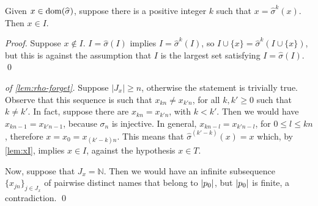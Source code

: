 
\begin{lemma}
\label{lem:xI}
Given $x \in \operatorname{dom}(\widehat{\sigma})$, suppose there is a positive integer $k$ such that $x = \widehat{\sigma}^k (x)$. Then $x \in I$.
\end{lemma}
\begin{proof}
Suppose $x \notin I$. $I = \widehat{\sigma}(I)$ implies $I = \widehat{\sigma}^k(I)$, so $I \cup \{x\} = \widehat{\sigma}^k(I \cup \{x\})$, but this is against the assumption that $I$ is the largest set satisfying $I = \widehat{\sigma}(I)$.
\qed
\end{proof}


\begin{proof}[of \cref{lem:rho-forget}]
Suppose $|J_x| \geq n$, otherwise the statement is trivially true. Observe that this sequence is such that $x_{kn} \neq x_{k'n}$, for all $k,k' \geq 0$ such that $k \neq k'$. In fact, suppose there are $x_{kn} = x_{k'n}$, with $k < k'$. Then we would have $x_{kn-1} = x_{k'n-1}$, because $\sigma_{n}$ is injective. In general, $x_{kn-l} = x_{k'n-l}$, for $0 \leq l \leq kn$, therefore $x = x_0 = x_{(k'-k)n}$. This means that $\widehat{\sigma}^{(k'-k)}(x) = x$ which, by \cref{lem:xI}, implies $x \in I$, against the hypothesis $x \in T$.

Now, suppose that $J_x = \mathbb{N}$. Then we would have an infinite subsequence $\{x_{jn}\}_{j \in J_x}$ of pairwise distinct names that belong to $|p_0|$, but $|p_0|$ is finite, a contradiction.
\qed
\end{proof}


